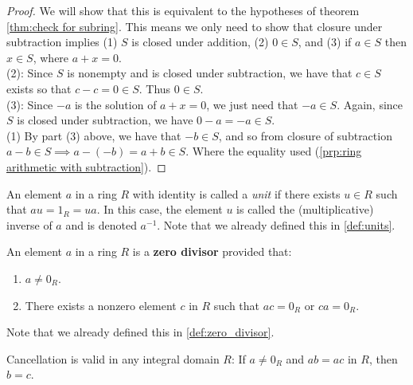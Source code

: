 \documentclass[../main.tex]{subfiles}
\begin{document}
\begin{proof}
We will show that this is equivalent to the hypotheses of theorem \ref{thm:check for subring}.
This means we only need to show that closure under subtraction implies (1) $S$ is closed 
under addition, (2) $0 \in S$, and (3) if $a \in S$ then $x\in S$, where $a+x = 0$. \\
(2): Since $S$ is nonempty and is closed under subtraction, we have that
 $c \in S$ exists so that $c-c = 0 \in S$. Thus $0 \in S$.\\
(3): Since $-a$ is the solution of $a+x = 0$, we just need that $-a \in S$.
Again, since $S$ is closed under subtraction, we have $0 - a = -a \in S$.\\
(1) By part (3) above, we have that $-b \in S$, and so from closure of subtraction
 \(a-b \in S \implies a - (-b) = a+b \in S\). Where the equality used (\ref{prp:ring arithmetic with subtraction}).

\end{proof}


\begin{definition}\label{def:units p2}
An element $a$ in a ring $R$ with identity is called a \textit{unit} if there exists $u \in R$ such that $au = 1_R = ua$. In this case, 
the element $u$ is called the (multiplicative) inverse of $a$ and is
denoted $a^{-1}$. Note that we already defined this in \ref{def:units}.
\end{definition}







\begin{definition}\label{def:zero divisor p2}
An element $a$ in a ring $R$ is a \textbf{zero divisor} provided that:
\begin{enumerate}
    \item $a \neq 0_R$.
    \item There exists a nonzero element $c$ in $R$ such that $ac = 0_R$ or $ca = 0_R$.
\end{enumerate}
Note that we already defined this in \ref{def:zero_divisor}.
\end{definition}




\begin{theorem}\label{thm:cancellation of Multiplication}
Cancellation is valid in any integral domain $R$: If $a \neq 0_R$ and $ab = ac$ in $R$, then $b = c$.
\end{theorem}
\end{document}
